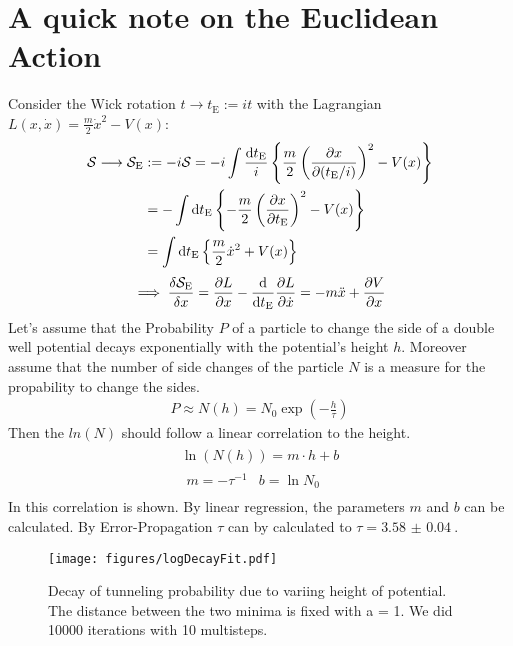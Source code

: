 \documentclass[11pt,a4paper]{scrartcl}
\newcommand{\action}{\ensuremath{\mathcal{S}}}
\newcommand{\SE}{\mathcal{S}_{\mathrm{E}}}
\newcommand{\tE}{\ensuremath{t_{\mathrm{E}}}}
\begin{document}
\section*{A quick note on the Euclidean Action}
Consider the Wick rotation $t\longrightarrow \tE:=it$ with the Lagrangian $L(x, \dot{x})=\frac{m}{2}\dot{x}^2-V(x)$:
\begin{align*}
    \action\longrightarrow\SE&:=-i\action
    =-i\int\frac{\dd\tE}{i}\left\{\frac{m}{2}\left(\pdv{x}{(\tE/i)}\right)^2-V(x)\right\} \\
    &=-\int\dd\tE\left\{-\frac{m}{2}\left(\pdv{x}{\tE}\right)^2-V(x)\right\} \\
    &=\int\dd\tE\left\{\frac{m}{2}\dot{x}^2+V(x)\right\}
\end{align*}
\begin{equation*}
    \implies\fdv{\SE}{x}=\pdv{L}{x}-\dv{\tE}\pdv{L}{\dot{x}}
    =-m\ddot{x}+\pdv{V}{x}
\end{equation*}
\newpage
Let's assume that the Probability $P$ of a particle to change the side of a double well potential decays exponentially with the potential's height $h$. Moreover assume that the number of side changes of the particle $N$ is a measure for the propability to change the sides.
\begin{align}
    P \approx N(h) = N_0 \exp\left( -\frac{h}{\tau}\right)\label{eq:time1}
\end{align}{}
Then the $ln(N)$ should follow a linear correlation to the height.
\begin{align}
\begin{split}
    \ln(N(h)) = m\cdot h + b\\
    \begin{array}{cc}
     m = -\tau^{-1} & b = \ln{N_0}
    \end{array}
\end{split} \label{eq:time2}
\end{align}
In  this correlation is shown. By linear regression, the parameters $m$ and $b$ can be calculated. By Error-Propagation $\tau$ can by calculated to $\tau = \SI{3.58(4)}{}$.

\begin{figure}
    \centering
    \texttt{[image: figures/logDecayFit.pdf]}
    \caption{Decay of tunneling probability due to variing height of potential. The distance between the two minima is fixed with a = 1. We did 10000 iterations with 10 multisteps.}
    \label{fig:logDecay}
\end{figure}{}
\end{document}
